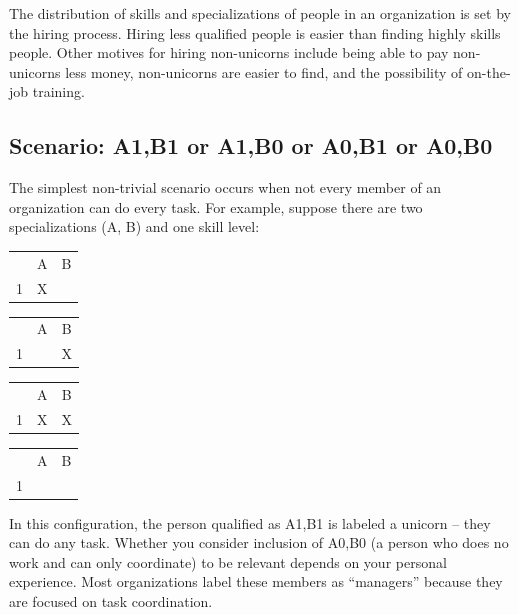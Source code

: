 The distribution of skills and specializations of people in an organization is set by the hiring process. Hiring less qualified people is easier than finding highly skills people. Other motives for hiring non-unicorns include being able to pay non-unicorns less money, non-unicorns are easier to find, and the possibility of on-the-job training.



\subsection*{Scenario: A1,B1 or A1,B0 or A0,B1 or A0,B0}

The simplest non-trivial scenario occurs when not every member of an organization can do every task. For example, suppose  there are two specializations (A, B) and one skill level: 

\begin{center}
\begin{tabular}{c|c|c|}
  & A & B \\
\cline{2-3}
1 & X &   \\
\cline{2-3}
\end{tabular} \quad
\begin{tabular}{c|c|c|}
  & A & B \\
\cline{2-3}
1 &   & X \\
\cline{2-3}
\end{tabular} \quad
\begin{tabular}{c|c|c|}
  & A & B \\
\cline{2-3}
1 & X & X \\
\cline{2-3}
\end{tabular} \quad
\begin{tabular}{c|c|c|}
  & A & B \\
\cline{2-3}
1 &   &   \\
\cline{2-3}
\end{tabular}
\end{center}
In this configuration, the person qualified as A1,B1 is labeled a unicorn -- they can do any task. Whether you consider inclusion of A0,B0 (a person who does no work and can only coordinate) to be relevant depends on your personal experience. Most organizations label these members as ``managers'' because they are focused on task coordination.

